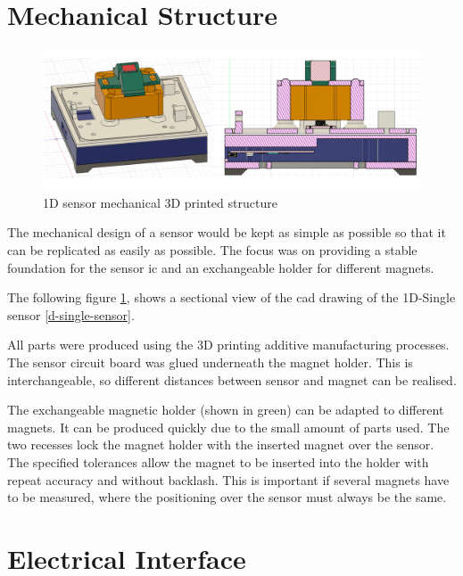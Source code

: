 \hypertarget{mechanical-structure}{%
\section{Mechanical Structure}\label{mechanical-structure}}

\begin{figure}
\centering
\includegraphics{./generated_images/border_1D_sensor_mechanical_3D_printed_structure.png}
\caption{1D sensor mechanical 3D printed structure
\label{1D_sensor_mechanical_3D_printed_structure.png}}
\end{figure}

The mechanical design of a sensor would be kept as simple as possible so
that it can be replicated as easily as possible. The focus was on
providing a stable foundation for the sensor \gls{ic} and an
exchangeable holder for different magnets.

The following figure
\ref{1D_sensor_mechanical_3D_printed_structure.png}, shows a sectional
view of the \gls{cad} drawing of the 1D-Single sensor
\ref{d-single-sensor}.

All parts were produced using the 3D printing additive manufacturing
processes. The sensor circuit board was glued underneath the magnet
holder. This is interchangeable, so different distances between sensor
and magnet can be realised.

The exchangeable magnetic holder (shown in green) can be adapted to
different magnets. It can be produced quickly due to the small amount of
parts used. The two recesses lock the magnet holder with the inserted
magnet over the sensor. The specified tolerances allow the magnet to be
inserted into the holder with repeat accuracy and without backlash. This
is important if several magnets have to be measured, where the
positioning over the sensor must always be the same.

\hypertarget{electrical-interface}{%
\section{Electrical Interface}\label{electrical-interface}}

